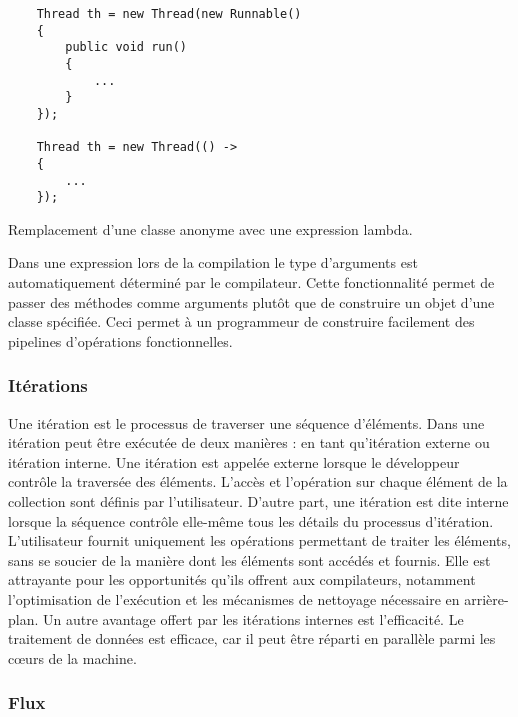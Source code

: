\begin{Listing}[tbp]
\begin{lstlisting}
	Thread th = new Thread(new Runnable()
	{
		public void run()
		{
			...
		}
	});

	Thread th = new Thread(() ->
	{
		...
	});
\end{lstlisting}
\caption{Remplacement d’une classe anonyme avec une expression lambda.}
\label{lambdaAsFonctionalInterface}
\end{Listing}

Dans une expression  lors de la compilation le type d'arguments est automatiquement d\'etermin\'e par le compilateur. Cette fonctionnalit\'e permet de passer des m\'ethodes comme arguments plut\^ot que de construire un objet d'une classe sp\'ecifi\'ee. Ceci permet \`a un programmeur de construire facilement des pipelines d'op\'erations fonctionnelles.


\subsubsection{It\'erations}

Une it\'eration est le processus de traverser une s\'equence d'\'el\'ements. Dans  une it\'eration peut \^etre ex\'ecut\'ee de deux mani\`eres : en tant qu'it\'eration externe ou it\'eration interne. Une it\'eration est appelée externe lorsque le d\'eveloppeur contr\^ole la travers\'ee des \'el\'ements.  L'acc\`es et l'op\'eration sur chaque \'el\'ement de la collection sont d\'efinis par l'utilisateur. D'autre part, une it\'eration est dite interne lorsque la s\'equence contr\^ole elle-m\^eme tous les d\'etails du processus d'it\'eration. L'utilisateur fournit uniquement les op\'erations permettant de traiter les \'el\'ements, sans se soucier de la mani\`ere dont les \'el\'ements sont acc\'ed\'es et fournis.
Elle est attrayante pour les opportunit\'es qu'ils offrent aux compilateurs, notamment l'optimisation de l'exécution et les m\'ecanismes de nettoyage n\'ecessaire en arri\`ere-plan. Un autre avantage offert par les it\'erations internes est l'efficacit\'e. Le traitement de donn\'ees est efficace, car il peut \^etre r\'eparti en parall\`ele parmi les cœurs de la machine.


\subsubsection{Flux}


